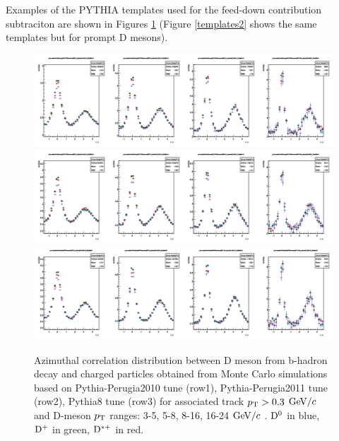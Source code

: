 Examples of the PYTHIA templates used for the feed-down contribution subtraciton are shown in Figures \ref{templates1} (Figure \ref{templates2} shows the same templates but for prompt D mesons).

\begin{figure}
\centering
\includegraphics[width=1\linewidth]{figures/Template/1DCompare_allDpTfromB_AssoPt_0dot3to99dot0GeVc_Perugia2010.png}
\includegraphics[width=1\linewidth]{figures/Template/1DCompare_allDpTfromB_AssoPt_0dot3to99dot0GeVc_Perugia2011.png}
\includegraphics[width=1\linewidth]{figures/Template/1DCompare_allDpTfromB_AssoPt_0dot3to99dot0GeVc_Pythia8.png}
\caption{Azimuthal correlation distribution between D meson from b-hadron decay and charged particles obtained from Monte Carlo simulations
based on Pythia-Perugia2010 tune (row1), Pythia-Perugia2011 tune (row2), Pythia8 tune (row3) for associated track $p_{\rm T} > 0.3$ $\mathrm{GeV}/c$  and D-meson $p_{\rm T}$ ranges: 3-5, 5-8, 8-16, 16-24 $\mathrm{GeV}/c$ . ${\rm D^0}$ in blue, ${\rm D^+}$ in green, ${\rm D^{*+}}$ in red.}
\label{templates1}
\end{figure}

